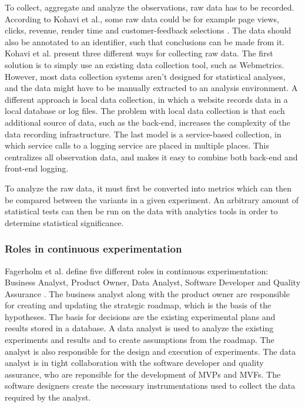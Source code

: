 \documentclass[english]{tktltiki2}
\theoremstyle{definition}
\theoremstyle{remark}
\begin{document}
To collect, aggregate and analyze the observations, raw data has to be recorded. According to Kohavi et al., some raw data could be for example page views, clicks, revenue, render time and customer-feedback selections \cite{kohavi2007practical}. The data should also be annotated to an identifier, such that conclusions can be made from it. Kohavi et al. present three different ways for collecting raw data. The first solution is to simply use an existing data collection tool, such as Webmetrics. However, most data collection systems aren't designed for statistical analyses, and the data might have to be manually extracted to an analysis environment. A different approach is local data collection, in which a website records data in a local database or log files. The problem with local data collection is that each additional source of data, such as the back-end, increases the complexity of the data recording infrastructure. The last model is a service-based collection, in which service calls to a logging service are placed in multiple places. This centralizes all observation data, and makes it easy to combine both back-end and front-end logging.  

To analyze the raw data, it must first be converted into metrics which can then be compared between the variants in a given experiment. An arbitrary amount of statistical tests can then be run on the data with analytics tools in order to determine statistical significance. 

\subsubsection{Roles in continuous experimentation}
Fagerholm et al. define five different roles in continuous experimentation: Business Analyst, Product Owner, Data Analyst, Software Developer and Quality Assurance \cite{fagerholm2014building}. The business analyst along with the product owner are responsible for creating and updating the strategic roadmap, which is the basis of the hypotheses. The basis for decisions are the existing experimental plans and results stored in a database. A data analyst is used to analyze the existing experiments and results and to create assumptions from the roadmap. The analyst is also responsible for the design and execution of experiments. The data analyst is in tight collaboration with the software developer and quality assurance, who are reponsible for the development of MVPs and MVFs. The software designers create the necessary instrumentations used to collect the data required by the analyst.  
\end{document}
